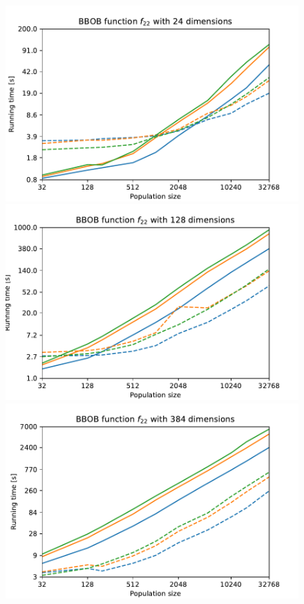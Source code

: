 \begin{figure}[ht!]
    \begin{minipage}[t]{0.32\textwidth}
        \centering
        \includegraphics[width=\textwidth]{img/runs/time_es_schema_fn22_24d.pdf}
    \end{minipage}
    \hfill
    \begin{minipage}[t]{0.32\textwidth}
        \centering
        \includegraphics[width=\textwidth]{img/runs/time_es_schema_fn22_128d.pdf}
    \end{minipage}
    \hfill
    \begin{minipage}[t]{0.32\textwidth}
        \centering
        \includegraphics[width=\textwidth]{img/runs/time_es_schema_fn22_384d.pdf}
    \end{minipage}


\end{figure}

